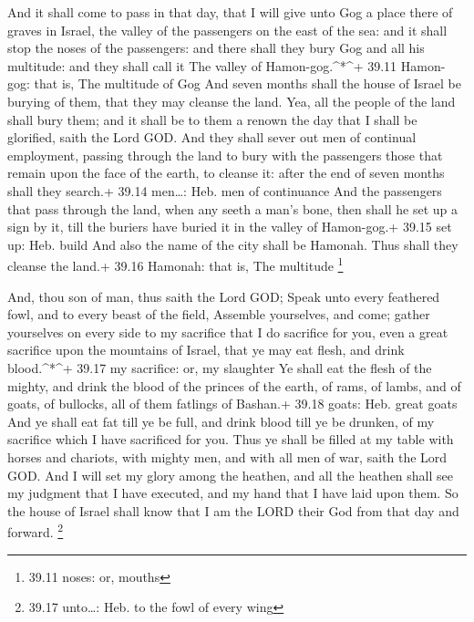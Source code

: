  And it shall come to pass in that day, that I will give
unto Gog a place there of graves in Israel, the valley of the passengers
on the east of the sea: and it shall stop the noses of the passengers:
and there shall they bury Gog and all his multitude: and they shall call
it The valley of Hamon-gog.\^{}*\^{}+ 39.11 Hamon-gog: that is, The
multitude of Gog  And seven months shall the house of
Israel be burying of them, that they may cleanse the land. 
Yea, all the people of the land shall bury them; and it shall be to them
a renown the day that I shall be glorified, saith the Lord GOD.
 And they shall sever out men of continual employment,
passing through the land to bury with the passengers those that remain
upon the face of the earth, to cleanse it: after the end of seven months
shall they search.+ 39.14 men\ldots: Heb. men of continuance
 And the passengers that pass through the land, when any
seeth a man's bone, then shall he set up a sign by it, till the buriers
have buried it in the valley of Hamon-gog.+ 39.15 set up: Heb. build
 And also the name of the city shall be Hamonah. Thus shall
they cleanse the land.+ 39.16 Hamonah: that is, The multitude
\footnote{39.11 noses: or, mouths}

 And, thou son of man, thus saith the Lord GOD; Speak unto
every feathered fowl, and to every beast of the field, Assemble
yourselves, and come; gather yourselves on every side to my sacrifice
that I do sacrifice for you, even a great sacrifice upon the mountains
of Israel, that ye may eat flesh, and drink blood.\^{}*\^{}+ 39.17 my
sacrifice: or, my slaughter  Ye shall eat the flesh of the
mighty, and drink the blood of the princes of the earth, of rams, of
lambs, and of goats, of bullocks, all of them fatlings of Bashan.+ 39.18
goats: Heb. great goats  And ye shall eat fat till ye be
full, and drink blood till ye be drunken, of my sacrifice which I have
sacrificed for you.  Thus ye shall be filled at my table
with horses and chariots, with mighty men, and with all men of war,
saith the Lord GOD.  And I will set my glory among the
heathen, and all the heathen shall see my judgment that I have executed,
and my hand that I have laid upon them.  So the house of
Israel shall know that I am the LORD their God from that day and
forward. \footnote{39.17 unto\ldots: Heb. to the fowl of every wing}

